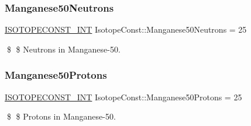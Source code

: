 \subsubsection{\texorpdfstring{Manganese50\+Neutrons}{Manganese50Neutrons}}
{\footnotesize\ttfamily \mbox{\hyperlink{group___isotope_const-_macros_ga5f18360b3e99483a35c32d789e62621c}{I\+S\+O\+T\+O\+P\+E\+C\+O\+N\+S\+T\+\_\+\+I\+NT}} Isotope\+Const\+::\+Manganese50\+Neutrons = 25}

\$ \$ Neutrons in Manganese-\/50. \mbox{\label{group___isotope_const-_manganese-_mn50_ga33d5f8303762e76ea77eb3ab9c7f121a}} 
\subsubsection{\texorpdfstring{Manganese50\+Protons}{Manganese50Protons}}
{\footnotesize\ttfamily \mbox{\hyperlink{group___isotope_const-_macros_ga5f18360b3e99483a35c32d789e62621c}{I\+S\+O\+T\+O\+P\+E\+C\+O\+N\+S\+T\+\_\+\+I\+NT}} Isotope\+Const\+::\+Manganese50\+Protons = 25}

\$ \$ Protons in Manganese-\/50. 